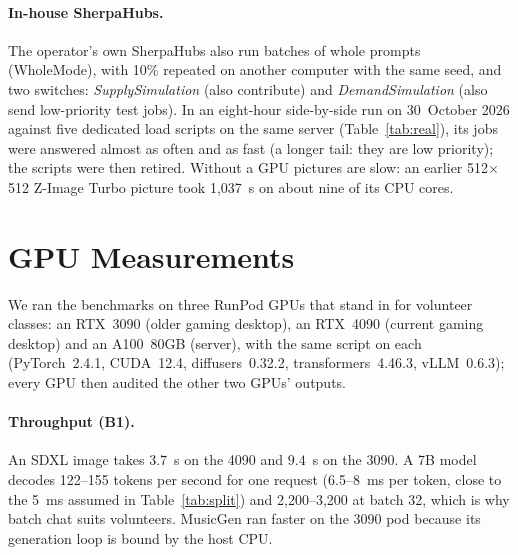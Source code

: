 \documentclass[11pt,a4paper]{article}
\theoremstyle{definition}
\theoremstyle{plain}
\begin{document}
\paragraph{In-house SherpaHubs.} The operator's own SherpaHubs also run batches of whole prompts (WholeMode),
with 10\% repeated on another computer with the same seed, and two switches:
\emph{SupplySimulation} (also contribute) and \emph{DemandSimulation} (also send low-priority test jobs). In an
eight-hour side-by-side run on 30~October 2026 against five dedicated load scripts on the same server
(Table~\ref{tab:real}), its jobs were answered almost as often and as fast (a longer tail: they are low
priority); the scripts were then retired. Without a GPU pictures are slow: an earlier 512$\times$512 Z-Image Turbo picture took 1{,}037~s on about nine of
its CPU cores.

\section{GPU Measurements}\label{sec:bench}

We ran the benchmarks on three RunPod GPUs that stand in for volunteer classes: an RTX~3090 (older gaming
desktop), an RTX~4090 (current gaming desktop) and an A100~80GB (server), with the same script on each
(PyTorch~2.4.1, CUDA~12.4, diffusers~0.32.2, transformers~4.46.3, vLLM~0.6.3); every GPU then audited the
other two GPUs' outputs.

\begin{table}[ht]
\centering
\caption{Measured time per work unit (B1). LLM throughput uses vLLM with 4-bit AWQ models and 512 output
tokens per request; 32B does not fit in 24~GB. LTX-Video on the 24~GB cards ran with CPU offload.}\label{tab:bench-throughput}
\footnotesize

\end{table}

\paragraph{Throughput (B1).} An SDXL image takes $3.7$~s on the 4090 and $9.4$~s on the 3090. A 7B model
decodes 122--155 tokens per second for one request (6.5--8~ms per token, close to the 5~ms assumed in
Table~\ref{tab:split}) and 2{,}200--3{,}200 at batch 32, which is why batch chat suits volunteers. MusicGen ran
faster on the 3090 pod because its generation loop is bound by the host CPU.
\end{document}

